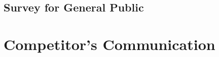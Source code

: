 \documentclass[12pt]{article}
\begin{document}
\subsection{Survey for General Public}\label{qgp}

\section{Competitor's Communication}\label{comp}
\end{document}
